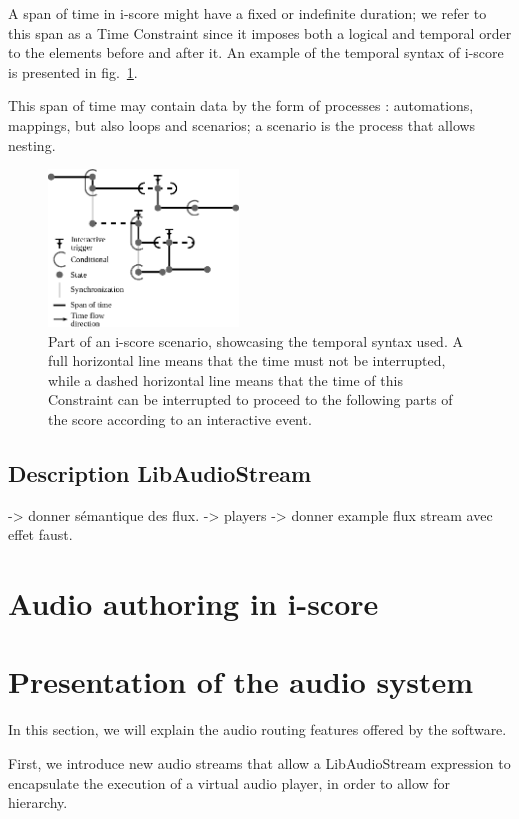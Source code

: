 \documentclass{article}
\begin{document}
A span of time in i-score might have a fixed or indefinite duration;
we refer to this span as a Time Constraint since it imposes both a logical and temporal order to the elements before and after it.
An example of the temporal syntax of i-score is presented in fig.~\ref{fig.iscore-example}.
 
This span of time may contain data by the form of processes : automations, mappings, but also loops and scenarios; a scenario is the process that allows nesting. 

\begin{figure}
	\centering
	\includegraphics[width=0.45\textwidth]{figures/iscore-example.eps}
	\caption{Part of an i-score scenario, showcasing the temporal syntax used. 
		A full horizontal line means that the time must not be interrupted, 
		while a dashed horizontal line means that the time of this Constraint can be interrupted to proceed 
		to the following parts of the score according to an interactive event.}
	\label{fig.iscore-example}
\end{figure}

\subsection{Description LibAudioStream}
-> donner sémantique des flux.
-> players
-> donner example flux stream avec effet faust.
\section{Audio authoring in i-score}

\section{Presentation of the audio system}
In this section, we will explain the audio routing 
features offered by the software.

First, we introduce new audio streams that allow a LibAudioStream
expression to encapsulate the execution of a virtual audio player, 
in order to allow for hierarchy.
\end{document}
